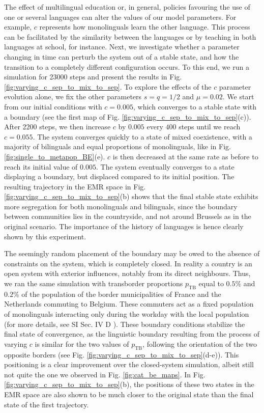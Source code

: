 \documentclass[../thesis.tex]{subfiles}
\begin{document}
The effect of multilingual education or, in general, policies favouring the use of one or
several languages can alter the values of our model parameters. For example, $c$
represents how monolinguals learn the other language. This process can be facilitated by
the similarity between the languages or by teaching in both languages at school, for
instance. Next, we investigate whether a parameter changing in time can perturb the
system out of a stable state, and how the transition to a completely different
configuration occurs. To this end, we run a simulation for 23000 steps and present the
results in Fig. \ref{fig:varying_c_sep_to_mix_to_sep}. To explore the effects of the $c$
parameter evolution alone, we fix the other parameters $s = q = 1/2$ and $\mu = 0.02$.
We start from our initial conditions with $c = 0.005$, which converges to a stable state
with a boundary (see the first map of Fig.
\ref{fig:varying_c_sep_to_mix_to_sep}(c)). After 2200 steps, we then increase $c$
by $0.005$ every $400$ steps until we reach $c = 0.055$. The system converges quickly to
a state of mixed coexistence, with a majority of bilinguals and equal proportions of
monolinguals, like in Fig. \ref{fig:single_to_metapop_BE}(e). $c$ is then
decreased at the same rate as before to reach its initial value of $0.005$. The system
eventually converges to a state displaying a boundary, but displaced compared to its
initial position. The
resulting trajectory in the \ac{EMR} space in Fig.
\ref{fig:varying_c_sep_to_mix_to_sep}(b) shows that the final stable state
exhibits more segregation for both monolinguals and bilinguals, since the boundary
between communities lies in the countryside, and not around Brussels as in the original
scenario. The importance of the history of languages is hence clearly shown by this
experiment.

The seemingly random placement of the boundary may be owed to the absence of constraints
on the system, which is completely closed. In reality a country is an open system with
exterior influences, notably from its direct neighbours. Thus, we ran the same simulation
with transborder proportions $p_{\text{TB}}$ equal to $0.5\%$ and $0.2\%$ of the
population of the border municipalities of France and the Netherlands commuting to
Belgium. These commuters act as a fixed population of monolinguals interacting only
during the workday with the local population (for more details, see SI Sec. IV D
\cite{supp}). These boundary conditions stabilize the final state of convergence, as the
linguistic boundary resulting from the process of varying $c$ is similar for the two
values of $p_{\text{TB}}$, following the orientation of the two opposite borders (see
Fig. \ref{fig:varying_c_sep_to_mix_to_sep}(d-e)). This positioning is a
clear improvement over the closed-system simulation, albeit still not quite the one we
observed in Fig. \ref{fig:cat_be_maps}. In Fig.
\ref{fig:varying_c_sep_to_mix_to_sep}(b), the positions of these two states in
the \ac{EMR} space are also shown to be much closer to the original state than the final
state of the first trajectory.
\end{document}
